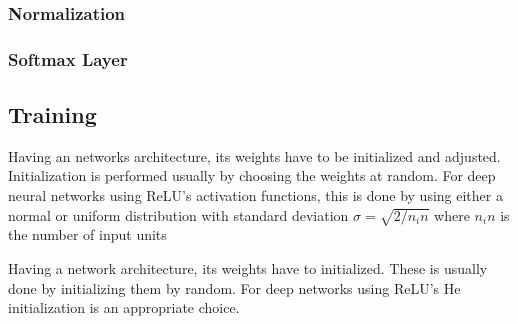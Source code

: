 

\subsubsection{Normalization}


\subsubsection{Softmax Layer}



\subsection{Training}
Having an networks architecture, its weights have to be initialized and adjusted. Initialization is performed usually by choosing the weights at random. For deep neural networks using ReLU's activation functions, this is done by using either a normal or uniform distribution with standard deviation $\sigma = \sqrt{2/n_in}$ where $n_in$ is the number of input units


Having a network architecture, its weights have to initialized. These is usually done by initializing them by random. For deep networks using ReLU's He initialization is an appropriate choice. 


